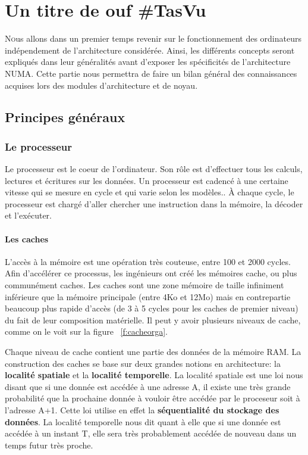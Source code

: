 \chapter{Un titre de ouf \#TasVu}

  \lettrine[nindent=0em,lines=3]{N} ous allons dans un premier temps revenir sur le fonctionnement des
  ordinateurs indépendement de l'architecture considérée. Ainsi, les différents
  concepts seront expliqués dans leur généralités avant d'exposer les
  spécificités de l'architecture NUMA. Cette partie nous permettra de faire un
  bilan général des connaissances acquises lors des modules d'architecture et de
  noyau.


  \section{Principes généraux}

    \subsection{Le processeur}

    Le processeur est le coeur de l'ordinateur.  Son rôle est d'effectuer tous
    les calculs, lectures et écritures sur les données. Un processeur est
    cadencé à une certaine vitesse qui se mesure en cycle et qui varie selon les
    modèles.. À chaque cycle, le processeur est chargé d'aller chercher une
    instruction dans la mémoire, la décoder et l'exécuter.

    \subsubsection{Les caches}

      L'accès à la mémoire est une opération très couteuse, entre 100 et 2000
      cycles\cite{Lepers2014}. Afin d'accélérer ce processus, les ingénieurs ont
      créé les mémoires cache, ou plus communément caches. Les caches sont une
      zone mémoire de taille infiniment inférieure que la mémoire principale
      (entre 4Ko et 12Mo) mais en contrepartie beaucoup plus rapide d'accès (de
      3 à 5 cycles pour les caches de premier niveau) du fait de leur
      composition matérielle. Il peut y avoir plusieurs niveaux de cache, comme
      on le voit sur la figure ~\ref{f:cacheorga}.


      Chaque niveau de cache contient une partie des données de la mémoire
      RAM. La construction des caches se base sur deux grandes notions en
      architecture: la \textbf{localité spatiale} et la \textbf{localité
        temporelle}. La localité spatiale est une loi nous disant que si une
      donnée est accédée à une adresse A, il existe une très grande probabilité
      que la prochaine donnée à vouloir être accédée par le proceseur soit à
      l'adresse A+1. Cette loi utilise en effet la \textbf{séquentialité du
        stockage des données}. La localité temporelle nous dit quant à elle que
      si une donnée est accédée à un instant T, elle sera très probablement
      accédée de nouveau dans un temps futur très proche.
      
